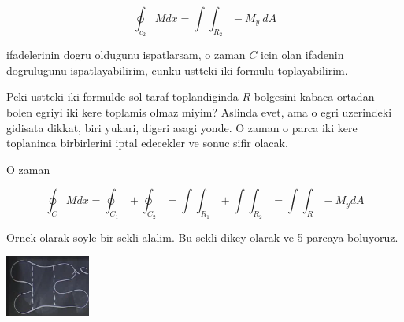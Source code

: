 \documentclass[12pt,fleqn]{article}
\begin{document}
\[ \oint_{c_2} M dx  = \int \int_{R_2} -M_y \ dA \]

ifadelerinin dogru oldugunu ispatlarsam, o zaman $C$ icin olan ifadenin
dogrulugunu ispatlayabilirim, cunku ustteki iki formulu toplayabilirim. 

Peki ustteki iki formulde sol taraf toplandiginda $R$ bolgesini kabaca
ortadan bolen egriyi iki kere toplamis olmaz miyim? Aslinda evet, ama o
egri uzerindeki gidisata dikkat, biri yukari, digeri asagi yonde. O zaman o
parca iki kere toplaninca birbirlerini iptal edecekler ve sonuc sifir olacak.

O zaman 

\[ \oint_C M dx = \oint_{C_1} + \oint_{C_2} =
\int \int_{R_1} + \int \int_{R_2} = 
\int \int_R -M_ydA
\]

Ornek olarak soyle bir sekli alalim. Bu sekli dikey olarak ve 5 parcaya
boluyoruz.

\includegraphics[height=2cm]{22_6.png}
\end{document}

